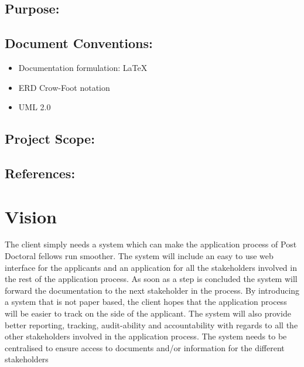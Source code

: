 \documentclass[12pt]{article}
\begin{document}
		\subsection{Purpose:}
		\vspace{0.2in}
		 
	
		\vspace{0.2in}
	
		\subsection{Document Conventions:}
		\vspace{0.1in}
		\begin{itemize}
			\item Documentation formulation: LaTeX
			\item ERD Crow-Foot notation
			\item UML 2.0
		\end{itemize}
	
		\vspace{0.2in}
	
		\subsection{Project Scope:}
		\vspace{0.2in}		
		
		\vspace{0.2in}
	
		\subsection{References:}
		\vspace{0.1in}
			
	
	\vspace{0.5in}
	
	\newpage
	\section{Vision} %
	\vspace{0.2in}
	The client simply needs a system which can make the application process of Post Doctoral fellows run smoother. The system will include an easy to use web interface for the applicants and an application for all the stakeholders involved in the rest of the application process. As soon as a step is concluded the system will forward the documentation to the next stakeholder in the process. By introducing a system that is not paper based, the client hopes that the application process will be easier to track on the side of the applicant. The system will also provide better reporting, tracking, audit-ability and accountability with regards to all the other stakeholders involved in the application process. The system needs to be centralised to ensure access to documents and/or information for the different stakeholders
	\vspace{0.5in}
	
\end{document}
